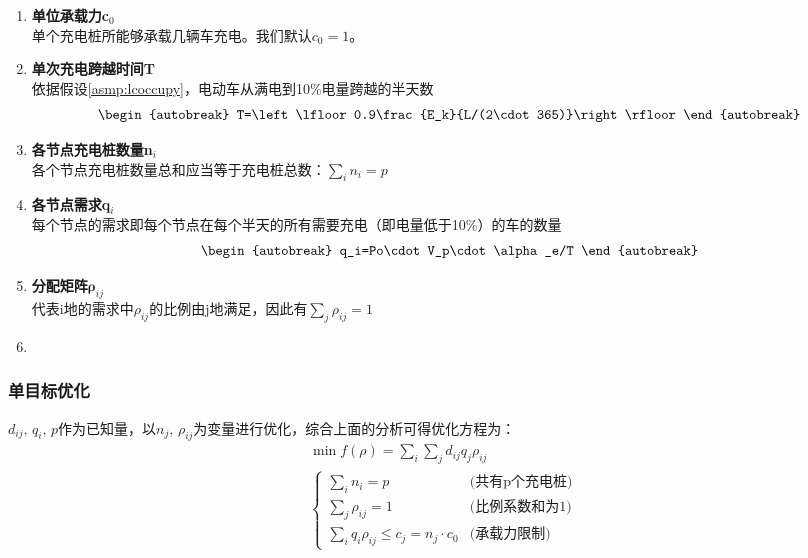 \documentclass[12pt, a4paper, oneside]{ctexart}
\begin{document}
\begin{enumerate}[label = \alph*)]
        \item \textbf{单位承载力c\(_0\)}\\
            单个充电桩所能够承载几辆车充电。我们默认\(c_0=1\)。
        \item \textbf{单次充电跨越时间T}\\
            依据假设\ref{asmp:lcoccupy}，电动车从满电到10\%电量跨越的半天数\begin{align}\begin{autobreak}
	T=\left\lfloor 0.9\frac{E_k}{L/(2\cdot 365)}\right\rfloor 
\end{autobreak}\end{align}
        \item \textbf{各节点充电桩数量n\(_i\)}\\
            各个节点充电桩数量总和应当等于充电桩总数：\(\sum\limits_i n_i=p \)
        \item \textbf{各节点需求q\(_i\)}\\
            每个节点的需求即每个节点在每个半天的所有需要充电（即电量低于10\%）的车的数量\begin{align}\begin{autobreak}
	q_i=Po\cdot V_p\cdot\alpha_e/T
\end{autobreak}\end{align}
        \item \textbf{分配矩阵\(\mathbf\rho_{ij}\)}\\
            代表i地的需求中\(\rho_{ij}\)的比例由j地满足，因此有\(\sum\limits_j \rho_{ij}=1\)
        \item 
    \end{enumerate}
    \subsubsection{单目标优化}
    \(d_{ij},\,q_i,\,p\)作为已知量，以\(n_j,\,\rho_{ij}\)为变量进行优化，综合上面的分析可得优化方程为：
    \begin{align}
        &\min  f(\rho)=\sum_i \sum_jd_{ij} q_j \rho_{ij}\\
        &\begin{cases}
            \sum_i n_i=p &\text{(共有p个充电桩)}\\
            \sum_j \rho_{ij}=1&\text{(比例系数和为1)}\\
            \sum_i q_{i}\rho_{ij}\leqslant c_j=n_j \cdot c_0&\text{(承载力限制)}
        \end{cases}
    \end{align}
\end{document}
